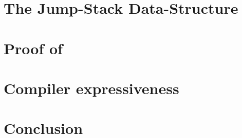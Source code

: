 \documentclass[a4paper,USenglish]{lipics}
\begin{document}
\section{The Jump-Stack Data-Structure}
\label{Section:jump}


\section{Proof of }
\label{Section:proof}


\section{\Java Compiler expressiveness}
\label{Section:compiler}


\section{Conclusion}
\label{Section:zz}


\small

\end{document}
